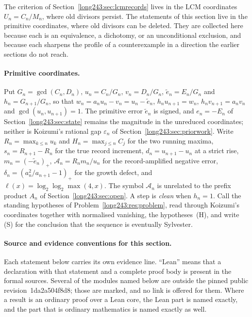 \documentclass[11pt]{article}
\renewcommand{\commitshort}{1da2a504f8d8}
\begin{document}
The criterion of Section~\ref{long243:sec:lcmrecords} lives in the LCM coordinates
$U_n=C_n/M_n$, where old divisors persist.  The statements of this section live
in the primitive coordinates, where old divisors can be deleted.  They are
collected here because each is
an equivalence, a dichotomy, or an unconditional exclusion, and because each
sharpens the profile of a counterexample in a direction the earlier sections do
not reach.

\paragraph{Primitive coordinates.}
Put $G_n=\gcd(C_n,D_n)$, $u_n=C_n/G_n$, $v_n=D_n/G_n$, $\tilde e_n=E_n/G_n$
and $h_n=G_{n+1}/G_n$, so that $w_n=a_nu_n-v_n=u_n-\tilde e_n$,
$h_nu_{n+1}=w_n$, $h_nv_{n+1}=a_nv_n$ and $\gcd(u_n,u_{n+1})=1$.  The primitive
error $\tilde e_n$ is signed, and $e_n=-E_n$ of Section~\ref{long243:sec:state} remains
the magnitude in the unreduced coordinates; neither is Koizumi's rational gap
$\varepsilon_n$ of Section~\ref{long243:sec:priorwork}.  Write $R_n=\max_{k\le n}u_k$ and
$H_n=\max_{j\le n}C_j$ for the two running maxima, $s_n=R_{n+1}-R_n$ for the
true record increment, $d_n=u_{n+1}-u_n$ at a strict rise,
$m_n=(-\tilde e_n)_+$, $\mathcal A_n=R_nm_n/u_n$ for the record-amplified
negative error, $\delta_n=(a_n^2/a_{n+1}-1)_+$ for the growth defect, and
$\ell(x)=\log_2\log_2\max(4,x)$.  The symbol $\mathcal A_n$ is unrelated to the
prefix product $A_n$ of Section~\ref{long243:sec:open}.  A step is \emph{clean} when $h_n=1$.  Call the
standing hypotheses of Problem~\ref{long243:res:problem}, read through Koizumi's
coordinates together with normalised vanishing, the hypotheses~(H), and write
(S) for the conclusion that the sequence is eventually Sylvester.

\paragraph{Source and evidence conventions for this section.}
Each statement below carries its own evidence line.  ``Lean'' means that a
declaration with that statement and a complete proof body is present in the
formal sources.  Several of the modules named below are outside the pinned
public revision~\commitshort; those are marked, and no link is offered for them.
Where a result is an ordinary proof over a Lean core, the Lean part is named
exactly, and the part that is ordinary mathematics is named exactly as well.
\end{document}
